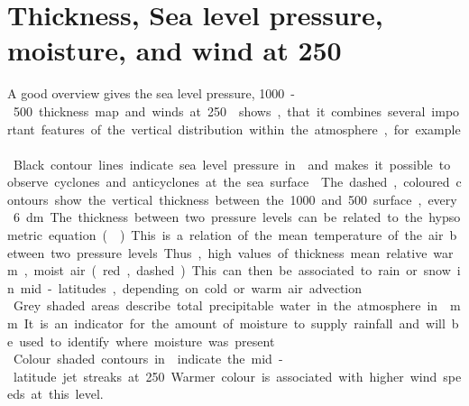 \section{Thickness, Sea level pressure, moisture, and wind at \SI{250}{\hPa}}
\label{sec:Geop}
A good overview gives the sea level pressure, \SI{1000}-\SI{500}{\hPa} thickness map and winds at \SI{250}{\hPa}.  shows, that it combines several important features of the vertical distribution within the atmosphere, for example.\\
Black contour lines indicate sea level pressure in \SI{}{\hPa} and makes it possible to observe cyclones and anticyclones at the sea surface. 

\noindent The dashed, coloured contours show the vertical thickness between the \SI{1000}{\hPa} and \SI{500}{\hPa} surface, every \SI{6}{\deca\meter}. The thickness between two pressure levels can be related to the hypsometric equation (). This is a relation of the mean temperature of the air between two pressure levels. Thus, high values of thickness mean relative warm, moist air (red, dashed). This can then be associated to rain or snow in mid-latitudes, depending on cold or warm air advection.
\\
Grey shaded areas describe total precipitable water in the atmosphere in \SI{}{\mm}. It is an indicator for the amount of moisture to supply rainfall and will be used to identify where moisture was present.
\\
Colour shaded contours in  indicate the mid-latitude jet streaks at \SI{250}{\hPa}. Warmer colour is associated with higher wind speeds at this level.  
%

